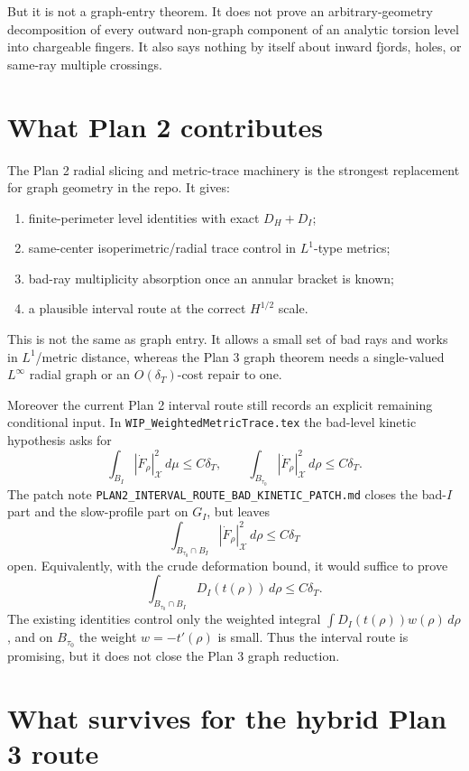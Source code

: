 \documentclass[11pt]{article}
\newcommand{\dT}{\delta_T}
\begin{document}
But it is not a graph-entry theorem.  It does not prove an arbitrary-geometry
decomposition of every outward non-graph component of an analytic torsion
level into chargeable fingers.  It also says nothing by itself about inward
fjords, holes, or same-ray multiple crossings.

\section{What Plan 2 contributes}

The Plan 2 radial slicing and metric-trace machinery is the strongest
replacement for graph geometry in the repo.  It gives:
\begin{enumerate}[label=\arabic*.]
\item finite-perimeter level identities with exact \(D_H+D_I\);
\item same-center isoperimetric/radial trace control in \(L^1\)-type metrics;
\item bad-ray multiplicity absorption once an annular bracket is known;
\item a plausible interval route at the correct \(H^{1/2}\) scale.
\end{enumerate}

This is not the same as graph entry.  It allows a small set of bad rays and
works in \(L^1\)/metric distance, whereas the Plan 3 graph theorem needs a
single-valued \(L^\infty\) radial graph or an \(O(\dT)\)-cost repair to one.

Moreover the current Plan 2 interval route still records an explicit remaining
conditional input.  In \texttt{WIP\_WeightedMetricTrace.tex} the bad-level
kinetic hypothesis asks for
\[
   \int_{B_I}|\dot F_\rho|_{\mathcal X}^2\,d\mu\le C\dT,
   \qquad
   \int_{B_{\tau_0}}|\dot F_\rho|_{\mathcal X}^2\,d\rho\le C\dT.
\]
The patch note \texttt{PLAN2\_INTERVAL\_ROUTE\_BAD\_KINETIC\_PATCH.md}
closes the bad-\(I\) part and the slow-profile part on \(G_I\), but leaves
\[
   \int_{B_{\tau_0}\cap B_I}|\dot F_\rho|_{\mathcal X}^2\,d\rho
      \le C\dT
\]
open.  Equivalently, with the crude deformation bound, it would suffice to
prove
\[
   \int_{B_{\tau_0}\cap B_I}D_I(t(\rho))\,d\rho\le C\dT.
\]
The existing identities control only the weighted integral
\(\int D_I(t(\rho))w(\rho)\,d\rho\), and on \(B_{\tau_0}\) the weight
\(w=-t'(\rho)\) is small.  Thus the interval route is promising, but it does
not close the Plan 3 graph reduction.

\section{What survives for the hybrid Plan 3 route}
\end{document}
